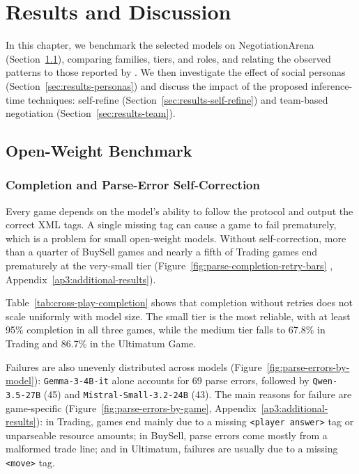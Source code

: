 
\chapter{Results and Discussion}

In this chapter, we benchmark the selected models on NegotiationArena (Section~\ref{sec:results-benchmark}), comparing families, tiers, and roles, and relating the observed patterns to those reported by \textcite{bianchi_how_2024}. We then investigate the effect of social personas (Section~\ref{sec:results-personas}) and discuss the impact of the proposed inference-time techniques: self-refine (Section~\ref{sec:results-self-refine}) and team-based negotiation (Section~\ref{sec:results-team}).
 
\section{Open-Weight Benchmark} \label{sec:results-benchmark}

\subsection{Completion and Parse-Error Self-Correction}


Every game depends on the model's ability to follow the protocol and output the correct XML tags. A single missing tag can cause a game to fail prematurely, which is a problem for small open-weight models. Without self-correction, more than a quarter of BuySell games and nearly a fifth of Trading games end prematurely at the very-small tier (Figure~\ref{fig:parse-completion-retry-bars} , Appendix~\ref{ap3:additional-results}).


Table~\ref{tab:cross-play-completion} shows that completion without retries does not scale uniformly with model size. The small tier is the most reliable, with at least 95\% completion in all three games, while the medium tier falls to 67.8\% in Trading and 86.7\% in the Ultimatum Game.

Failures are also unevenly distributed across models (Figure~\ref{fig:parse-errors-by-model}): \texttt{Gemma-3-4B-it} alone accounts for 69 parse errors, followed by \texttt{Qwen-3.5-27B} (45) and \texttt{Mistral-Small-3.2-24B} (43). The main reasons for failure are game-specific (Figure~\ref{fig:parse-errors-by-game}, Appendix~\ref{ap3:additional-results}): in Trading, games end mainly due to a missing \texttt{<player answer>} tag or unparseable resource amounts; in BuySell, parse errors come mostly from a malformed trade line; and in Ultimatum, failures are usually due to a missing \texttt{<move>} tag.


